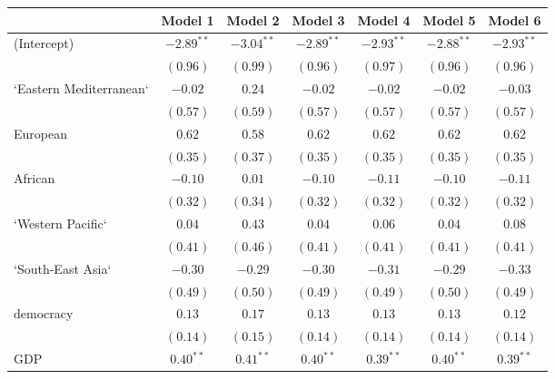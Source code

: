 
\begin{table}[!h]
\begin{center}
\begin{tabular}{l c c c c c c }
\toprule
 & Model 1 & Model 2 & Model 3 & Model 4 & Model 5 & Model 6 \\
\midrule
(Intercept)             & $-2.89^{**}$ & $-3.04^{**}$ & $-2.89^{**}$ & $-2.93^{**}$ & $-2.88^{**}$ & $-2.93^{**}$ \\
                        & $(0.96)$     & $(0.99)$     & $(0.96)$     & $(0.97)$     & $(0.96)$     & $(0.96)$     \\
`Eastern Mediterranean` & $-0.02$      & $0.24$       & $-0.02$      & $-0.02$      & $-0.02$      & $-0.03$      \\
                        & $(0.57)$     & $(0.59)$     & $(0.57)$     & $(0.57)$     & $(0.57)$     & $(0.57)$     \\
European                & $0.62$       & $0.58$       & $0.62$       & $0.62$       & $0.62$       & $0.62$       \\
                        & $(0.35)$     & $(0.37)$     & $(0.35)$     & $(0.35)$     & $(0.35)$     & $(0.35)$     \\
African                 & $-0.10$      & $0.01$       & $-0.10$      & $-0.11$      & $-0.10$      & $-0.11$      \\
                        & $(0.32)$     & $(0.34)$     & $(0.32)$     & $(0.32)$     & $(0.32)$     & $(0.32)$     \\
`Western Pacific`       & $0.04$       & $0.43$       & $0.04$       & $0.06$       & $0.04$       & $0.08$       \\
                        & $(0.41)$     & $(0.46)$     & $(0.41)$     & $(0.41)$     & $(0.41)$     & $(0.41)$     \\
`South-East Asia`       & $-0.30$      & $-0.29$      & $-0.30$      & $-0.31$      & $-0.29$      & $-0.33$      \\
                        & $(0.49)$     & $(0.50)$     & $(0.49)$     & $(0.49)$     & $(0.50)$     & $(0.49)$     \\
democracy               & $0.13$       & $0.17$       & $0.13$       & $0.13$       & $0.13$       & $0.12$       \\
                        & $(0.14)$     & $(0.15)$     & $(0.14)$     & $(0.14)$     & $(0.14)$     & $(0.14)$     \\
GDP                     & $0.40^{**}$  & $0.41^{**}$  & $0.40^{**}$  & $0.39^{**}$  & $0.40^{**}$  & $0.39^{**}$  \\

\end{tabular}
\end{center}
\end{table}
